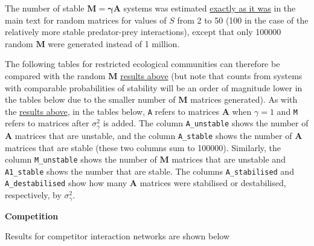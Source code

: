 \documentclass[]{article}
\begin{document}
The number of stable \(\mathbf{M = \gamma A}\) systems was estimated
\protect\hyperlink{IncrS}{exactly as it was} in the main text for random
matrices for values of \(S\) from 2 to 50 (100 in the case of the
relatively more stable predator-prey interactions), except that only
100000 random \(\mathbf{M}\) were generated instead of 1 million.

The following tables for restricted ecological communities can therefore
be compared with the random \(\mathbf{M}\)
\protect\hyperlink{IncrS}{results above} (but note that counts from
systems with comparable probabilities of stability will be an order of
magnitude lower in the tables below due to the smaller number of
\(\mathbf{M}\) matrices generated). As with the
\protect\hyperlink{IncrS}{results above}, in the tables below,
\texttt{A} refers to matrices \(\mathbf{A}\) when \(\gamma = 1\) and
\texttt{M} refers to matrices after \(\sigma^{2}_{\gamma}\) is added.
The column \texttt{A\_unstable} shows the number of \(\mathbf{A}\)
matrices that are unstable, and the column \texttt{A\_stable} shows the
number of \(\mathbf{A}\) matrices that are stable (these two columns sum
to 100000). Similarly, the column \texttt{M\_unstable} shows the number
of \(\mathbf{M}\) matrices that are unstable and \texttt{A1\_stable}
shows the number that are stable. The columns \texttt{A\_stabilised} and
\texttt{A\_destabilised} show how many \(\mathbf{A}\) matrices were
stabilised or destabilised, respectively, by \(\sigma^{2}_{\gamma}\).

\textbf{Competition}

Results for competitor interaction networks are shown below
\end{document}
